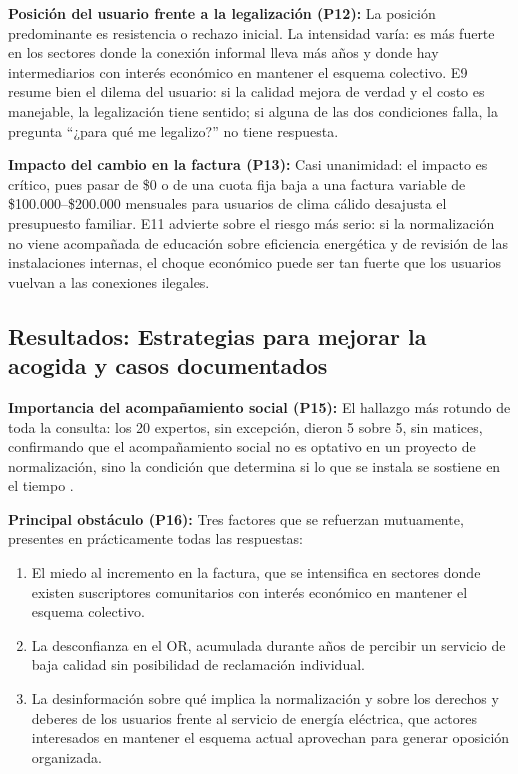 \textbf{Posición del usuario frente a la legalización (P12):} La posición predominante es resistencia o rechazo inicial. La intensidad varía: es más fuerte en los sectores donde la conexión informal lleva más años y donde hay intermediarios con interés económico en mantener el esquema colectivo. E9 resume bien el dilema del usuario: si la calidad mejora de verdad y el costo es manejable, la legalización tiene sentido; si alguna de las dos condiciones falla, la pregunta ``¿para qué me legalizo?'' no tiene respuesta.

\textbf{Impacto del cambio en la factura (P13):} Casi unanimidad: el impacto es crítico, pues pasar de \$0 o de una cuota fija baja a una factura variable de \$100.000--\$200.000 mensuales para usuarios de clima cálido desajusta el presupuesto familiar. E11 advierte sobre el riesgo más serio: si la normalización no viene acompañada de educación sobre eficiencia energética y de revisión de las instalaciones internas, el choque económico puede ser tan fuerte que los usuarios vuelvan a las conexiones ilegales.

\subsection{Resultados: Estrategias para mejorar la acogida y casos documentados}
\label{subsec:resultados_estrategias}

\textbf{Importancia del acompañamiento social (P15):} El hallazgo más rotundo de toda la consulta: los 20 expertos, sin excepción, dieron 5 sobre 5, sin matices, confirmando que el acompañamiento social no es optativo en un proyecto de normalización, sino la condición que determina si lo que se instala se sostiene en el tiempo \parencite{SerranoRueda2019, MendezFuentes2013}.

\textbf{Principal obstáculo (P16):} Tres factores que se refuerzan mutuamente, presentes en prácticamente todas las respuestas:

\begin{enumerate}[label=\roman*)]
    \item El miedo al incremento en la factura, que se intensifica en sectores donde existen suscriptores comunitarios con interés económico en mantener el esquema colectivo.
    \item La desconfianza en el OR, acumulada durante años de percibir un servicio de baja calidad sin posibilidad de reclamación individual.
    \item La desinformación sobre qué implica la normalización y sobre los derechos y deberes de los usuarios frente al servicio de energía eléctrica, que actores interesados en mantener el esquema actual aprovechan para generar oposición organizada.
\end{enumerate}

